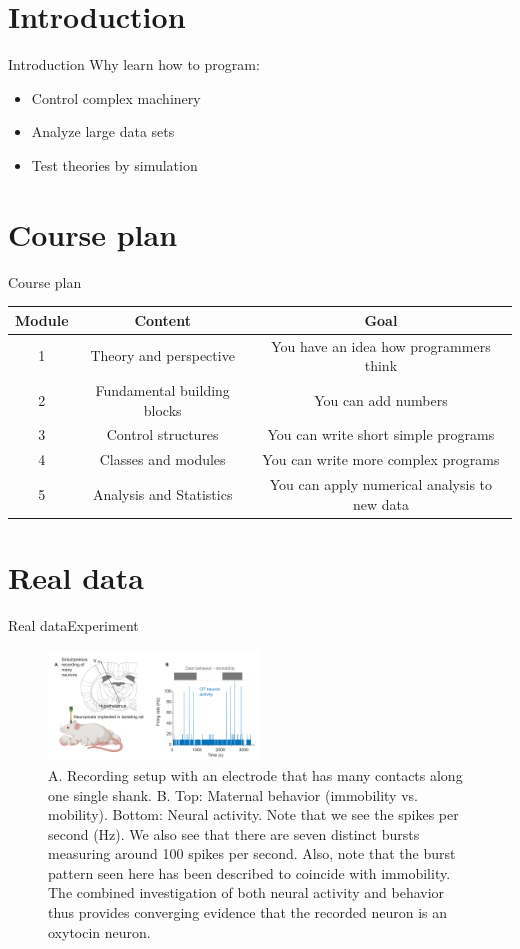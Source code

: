\documentclass[aspectratio=169]{beamer}
\begin{document}
\section{Introduction}
\begin{frame}{Introduction}
Why learn how to program:
\begin{itemize}
	\item Control complex machinery
	\item Analyze large data sets
	\item Test theories by simulation
\end{itemize}
\end{frame}

\section{Course plan}
\begin{frame}{Course plan}
\begin{tabular}{ccc}
	\toprule
	Module & Content & Goal \\
	\midrule
	1 & Theory and perspective & You have an idea how programmers think \\
	2 & Fundamental building blocks & You can add numbers \\
	3 & Control structures & You can write short simple programs \\
	4 & Classes and modules & You can write more complex programs \\
	5 & Analysis and Statistics & You can apply numerical analysis to new data \\
\end{tabular}
\end{frame}

\section{Real data}
\begin{frame}{Real data}{Experiment}
\begin{figure}[h]
\centering
\includegraphics[width=0.5\textwidth]{../img/experiment.jpg}
\caption{
	A. Recording setup with an electrode that has many contacts along one single shank.
	B. Top: Maternal behavior (immobility vs. mobility).
	Bottom: Neural activity. Note that we see the spikes per second (Hz). 
	We also see that there are seven distinct bursts measuring around 100 spikes per second.
	Also, note that the burst pattern seen here has been described to coincide with immobility.
	The combined investigation of both neural activity and behavior thus provides converging evidence
	that the recorded neuron is an oxytocin neuron.
}
\end{figure}
\end{frame}
\end{document}
